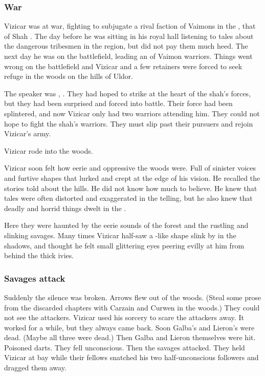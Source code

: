 \subsubsection{War}
Vizicar was at war, fighting to subjugate a rival faction of Vaimons in the \caliphate, that of Shah . 
The day before he was sitting in his royal hall listening to tales about the dangerous tribesmen in the region, but did not pay them much heed. 
The next day he was on the battlefield, leading an \ishrah of Vaimon warriors. 
Things went wrong on the battlefield and Vizicar and a few retainers were forced to seek refuge in the \wylde woods on the hills of Uldor. 

The speaker was \VizicarDurasRespina, \vaimoncaliph. 
They had hoped to strike at the heart of the shah's forces, but they had been surprised and forced into battle. 
Their force had been splintered, and now Vizicar only had two warriors attending him.
They could not hope to fight the shah's warriors.
They must slip past their pursuers and rejoin Vizicar's army. 



Vizicar rode into the woods.

Vizicar soon felt how eerie and oppressive the woods were.
Full of sinister voices and furtive shapes that lurked and crept at the edge of his vision. 
He recalled the stories told about the hills. 
He did not know how much to believe. 
He knew that tales were often distorted and exaggerated in the telling, but he also knew that deadly and horrid things dwelt in the \wylde. 

Here they were haunted by the eerie sounds of the forest and the rustling and slinking savages.
Many times Vizicar half-saw a \human-like shape slink by in the shadows, and thought he felt small glittering eyes peering evilly at him from behind the thick ivies. 





\subsubsection{Savages attack}
Suddenly the silence was broken. 
Arrows flew out of the woods. 
(Steal some prose from the discarded chapters with Carzain and Curwen in the woods.)
They could not see the attackers.
Vizicar used his sorcery to scare the attackers away.
It worked for a while, but they always came back.
Soon Galba's and Lieron's \relcs were dead.
(Maybe all three \relcs were dead.)
Then Galba and Lieron themselves were hit. 
Poisoned darts. 
They fell unconscious.
Then the savages attacked.
They held Vizicar at bay while their fellows snatched his two half-unconscious followers and dragged them away. 

